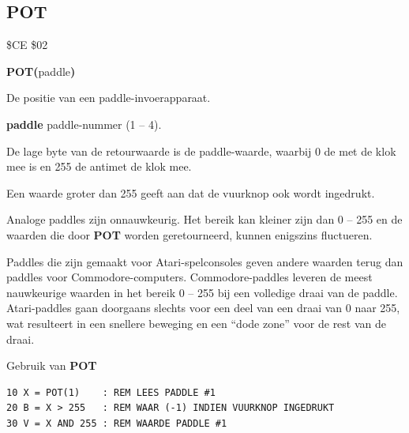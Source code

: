 \subsection{POT}
\begin{description}[leftmargin=2cm,style=nextline]
\item [Token:]    \$CE \$02

\item [Formaat:]   {\bf POT(}paddle{\bf)}

\item [Retourneert:]  De positie van een paddle-invoerapparaat.

                  {\bf paddle} paddle-nummer (1 -- 4).

                  De lage byte van de retourwaarde is de paddle-waarde, waarbij 0 de met de klok mee is en 255 de antimet de klok mee.

                  Een waarde groter dan 255 geeft aan dat de vuurknop ook wordt ingedrukt.

\item [Opmerkingen:]  Analoge paddles zijn onnauwkeurig. Het bereik kan kleiner zijn dan 0 -- 255 en de waarden die door {\bf POT} worden geretourneerd, kunnen enigszins fluctueren.

                  Paddles die zijn gemaakt voor Atari-spelconsoles geven andere waarden terug dan paddles voor Commodore-computers. Commodore-paddles leveren de meest nauwkeurige waarden in het bereik 0 -- 255 bij een volledige draai van de paddle. Atari-paddles gaan doorgaans slechts voor een deel van een draai van 0 naar 255, wat resulteert in een snellere beweging en een ``dode zone'' voor de rest van de draai.

\item [Voorbeeld:]  Gebruik van {\bf POT}

\begin{tcolorbox}[colback=black,coltext=white]
\verbatimfont{\codefont}
\begin{verbatim}
10 X = POT(1)    : REM LEES PADDLE #1
20 B = X > 255   : REM WAAR (-1) INDIEN VUURKNOP INGEDRUKT
30 V = X AND 255 : REM WAARDE PADDLE #1
\end{verbatim}
\end{tcolorbox}
\end{description}


\newpage
